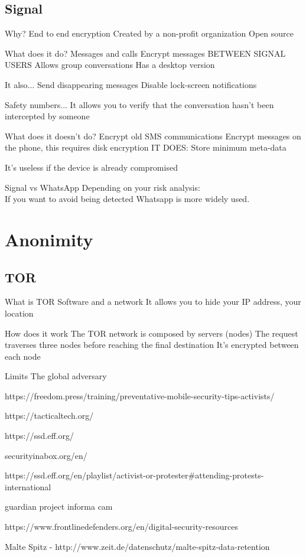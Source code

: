 \documentclass[11pt]{beamer}
\begin{document}
\subsection{Signal}
\begin{frame}{Why?}
End to end encryption
Created by a non-profit organization
Open source
\end{frame}
\begin{frame}{What does it do?}
Messages and calls
Encrypt messages BETWEEN SIGNAL USERS
Allows group conversations
Has a desktop version
\end{frame}
\begin{frame}{It also...}
Send disappearing messages
Disable lock-screen notifications
\end{frame}
\begin{frame}{Safety numbers...}
It allows you to verify that the conversation hasn't been intercepted by someone
\end{frame}
\begin{frame}{What does it doesn't do?}
Encrypt old SMS communications
Encrypt  messages on the phone, this requires disk  encryption
IT DOES: Store minimum meta-data
\end{frame}
\begin{frame}{}
It's useless if the device is already compromised
\end{frame}
\begin{frame}{Signal vs WhatsApp}
Depending on your risk analysis:\\
If you want to avoid being detected Whatsapp is more widely used.
\end{frame}
\section{Anonimity}
\subsection{TOR}
\begin{frame}{What is TOR}
Software and a network
It allows you to hide your IP address, your location
\end{frame}
\begin{frame}{How does it work}
The TOR network is composed by servers (nodes)
The request traverses three nodes before reaching the final destination
It's encrypted between each node
\end{frame}
\begin{frame}{Limits}
The global adversary
\end{frame}

https://freedom.press/training/preventative-mobile-security-tips-activists/

https://tacticaltech.org/

https://ssd.eff.org/

securityinabox.org/en/

https://ssd.eff.org/en/playlist/activist-or-protester#attending-protests-international

guardian project informa  cam

https://www.frontlinedefenders.org/en/digital-security-resources

 Malte Spitz - http://www.zeit.de/datenschutz/malte-spitz-data-retention
\end{document}
